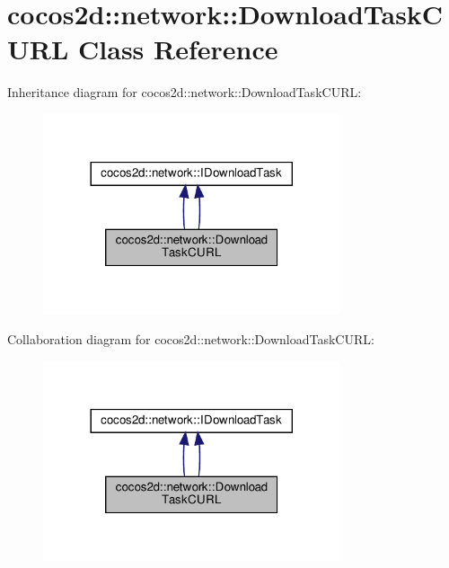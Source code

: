 \hypertarget{classcocos2d_1_1network_1_1DownloadTaskCURL}{}\section{cocos2d\+:\+:network\+:\+:Download\+Task\+C\+U\+RL Class Reference}
\label{classcocos2d_1_1network_1_1DownloadTaskCURL}


Inheritance diagram for cocos2d\+:\+:network\+:\+:Download\+Task\+C\+U\+RL\+:
\nopagebreak
\begin{figure}[H]
\begin{center}
\leavevmode
\includegraphics[width=248pt]{classcocos2d_1_1network_1_1DownloadTaskCURL__inherit__graph}
\end{center}
\end{figure}


Collaboration diagram for cocos2d\+:\+:network\+:\+:Download\+Task\+C\+U\+RL\+:
\nopagebreak
\begin{figure}[H]
\begin{center}
\leavevmode
\includegraphics[width=248pt]{classcocos2d_1_1network_1_1DownloadTaskCURL__coll__graph}
\end{center}
\end{figure}
